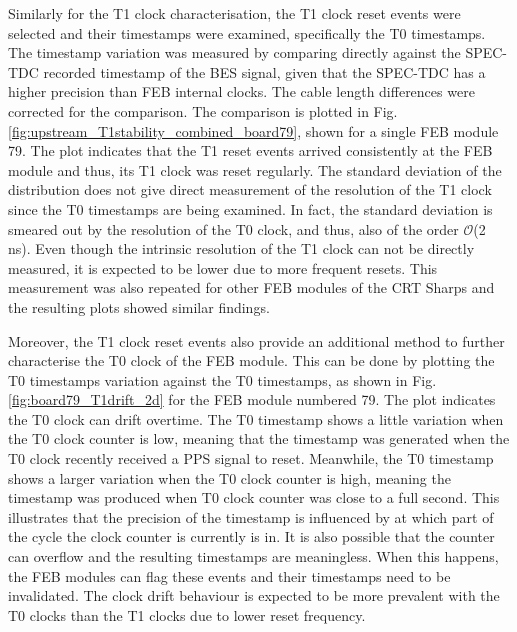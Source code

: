 Similarly for the T1 clock characterisation, the T1 clock reset events were selected and their timestamps were examined, specifically the T0 timestamps.
The timestamp variation was measured by comparing directly against the SPEC-TDC recorded timestamp of the BES signal, given that the SPEC-TDC has a higher precision than FEB internal clocks.
The cable length differences were corrected for the comparison.
The comparison is plotted in Fig. \ref{fig:upstream_T1stability_combined_board79}, shown for a single FEB module 79.
The plot indicates that the T1 reset events arrived consistently at the FEB module and thus, its T1 clock was reset regularly.
The standard deviation of the distribution does not give direct measurement of the resolution of the T1 clock since the T0 timestamps are being examined. 
In fact, the standard deviation is smeared out by the resolution of the T0 clock, and thus, also of the order $\mathcal{O}$(2 ns).
Even though the intrinsic resolution of the T1 clock can not be directly measured, it is expected to be lower due to more frequent resets.
This measurement was also repeated for other FEB modules of the CRT Sharps and the resulting plots showed similar findings.

Moreover, the T1 clock reset events also provide an additional method to further characterise the T0 clock of the FEB module. 
This can be done by plotting the T0 timestamps variation against the T0 timestamps, as shown in Fig. \ref{fig:board79_T1drift_2d} for the FEB module numbered 79.
The plot indicates the T0 clock can drift overtime.
The T0 timestamp shows a little variation when the T0 clock counter is low, meaning that the timestamp was generated when the T0 clock recently received a PPS signal to reset.
Meanwhile, the T0 timestamp shows a larger variation when the T0 clock counter is high, meaning the timestamp was produced when T0 clock counter was close to a full second.
This illustrates that the precision of the timestamp is influenced by at which part of the cycle the clock counter is currently is in.
It is also possible that the counter can overflow and the resulting timestamps are meaningless.
When this happens, the FEB modules can flag these events and their timestamps need to be invalidated.
The clock drift behaviour is expected to be more prevalent with the T0 clocks than the T1 clocks due to lower reset frequency.

